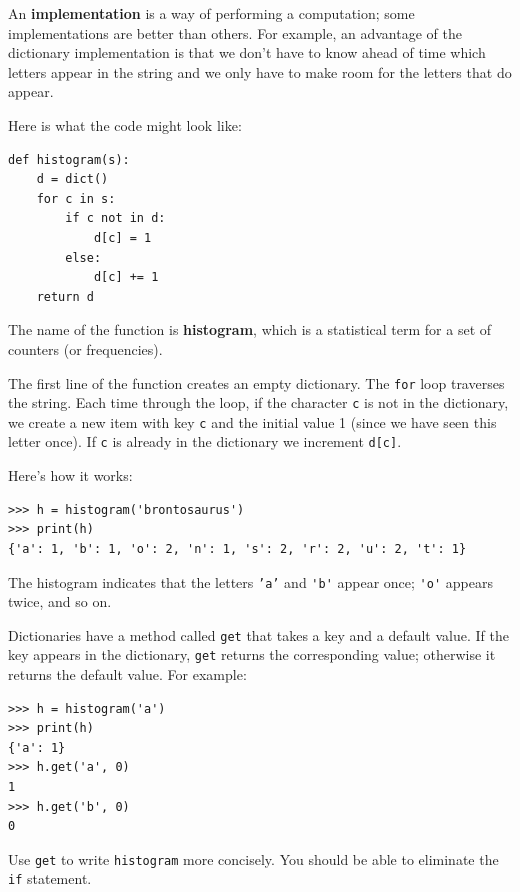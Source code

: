 \documentclass[10pt]{book}
\begin{document}
An {\bf implementation} is a way of performing a computation;
some implementations are better than others.  For example,
an advantage of the dictionary implementation is that we don't
have to know ahead of time which letters appear in the string
and we only have to make room for the letters that do appear.

Here is what the code might look like:

\beforeverb
\begin{verbatim}
def histogram(s):
    d = dict()
    for c in s:
        if c not in d:
            d[c] = 1
        else:
            d[c] += 1
    return d
\end{verbatim}
\afterverb
%
The name of the function is {\bf histogram}, which is a statistical
term for a set of counters (or frequencies).


The first line of the
function creates an empty dictionary.  The {\tt for} loop traverses
the string.  Each time through the loop, if the character {\tt c} is
not in the dictionary, we create a new item with key {\tt c} and the
initial value 1 (since we have seen this letter once).  If {\tt c} is
already in the dictionary we increment {\tt d[c]}.


Here's how it works:

\beforeverb
\begin{verbatim}
>>> h = histogram('brontosaurus')
>>> print(h)
{'a': 1, 'b': 1, 'o': 2, 'n': 1, 's': 2, 'r': 2, 'u': 2, 't': 1}
\end{verbatim}
\afterverb
%
The histogram indicates that the letters {\tt 'a'} and \verb"'b'"
appear once; \verb"'o'" appears twice, and so on.

\begin{ex}


Dictionaries have a method called {\tt get} that takes a key
and a default value.  If the key appears in the dictionary,
{\tt get} returns the corresponding value; otherwise it returns
the default value.  For example:

\beforeverb
\begin{verbatim}
>>> h = histogram('a')
>>> print(h)
{'a': 1}
>>> h.get('a', 0)
1
>>> h.get('b', 0)
0
\end{verbatim}
\afterverb
%
Use {\tt get} to write {\tt histogram} more concisely.  You
should be able to eliminate the {\tt if} statement.
\end{ex}
\end{document}
